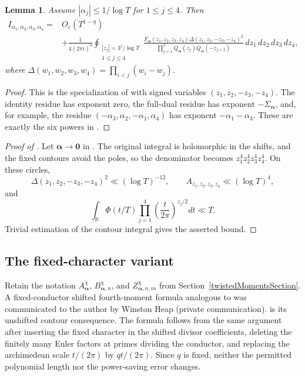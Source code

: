 \documentclass[oneside, 12pt]{amsart}
\newtheorem{lem}[thm]{Lemma}
\theoremstyle{definition}
\begin{document}
{		\begin{lem}\label{snaithContourLemma}
			Assume $|\alpha_j|\leq1/\log T$ for $1\leq j\leq4$.  Then
			\begin{align*}
				I_{\alpha_1,\alpha_2,\alpha_3,\alpha_4}
				={}&O_\varepsilon(T^{1-\eta})\\
				&+\frac1{4(2\pi i)^4}
				\oint_{\substack{|z_j|=3^j/\log T\\1\leq j\leq4}}
				\frac{F_{\boldsymbol\alpha}(z_1,z_2,z_3,z_4)
					\Delta(z_1,z_2,-z_3,-z_4)^2}
				{\displaystyle\prod_{j=1}^{2}
					Q_{\boldsymbol\alpha}(z_j)Q_{\boldsymbol\alpha}(-z_{j+2})}
				\,dz_1\,dz_2\,dz_3\,dz_4,
			\end{align*}
			where $\Delta(w_1,w_2,w_3,w_4)=\prod_{i<j}(w_i-w_j)$.
		\end{lem}
		
		\begin{proof}
			This is the specialization of
			\cite[Lemma~2.5.1]{ConreyFarmerKeatingRubinsteinSnaith} with signed
			variables $(z_1,z_2,-z_3,-z_4)$.  The identity residue has exponent
			zero, the full-dual residue has exponent
			$-\Sigma_{\boldsymbol\alpha}$, and, for example, the residue
			$(-\alpha_3,\alpha_2,-\alpha_1,\alpha_4)$ has exponent
			$-\alpha_1-\alpha_3$.  These are exactly the six powers in
			.
		\end{proof}
		
		\begin{proof}[Proof of ]
			Let $\boldsymbol\alpha\to\boldsymbol0$ in .
			The original integral is holomorphic in the shifts, and the fixed
			contours avoid the poles, so the denominator becomes
			$z_1^4z_2^4z_3^4z_4^4$.
			On these circles,
			\[
			\Delta(z_1,z_2,-z_3,-z_4)^2\ll(\log T)^{-12},
			\qquad A_{z_1,z_2,z_3,z_4}\ll(\log T)^4,
			\]
			and
			\[
			\int_{\mathbb R}\Phi(t/T)
			\prod_{j=1}^{4}\left(\frac t{2\pi}\right)^{z_j/2}dt\ll T.
			\]
			Trivial estimation of the contour integral gives the asserted bound.
		\end{proof}
		
		\subsection*{The fixed-character variant}
		Retain the notation $A^\chi_{\boldsymbol\alpha}$,
		$B^\chi_{\boldsymbol\alpha,n}$, and
		$Z^\chi_{\boldsymbol\alpha,n,m}$ from
		Section~\ref{twistedMomentsSection}.  A fixed-conductor shifted
		fourth-moment formula analogous to
		\cite[Theorem~1.1]{BettinBuiLiRadziwill} was communicated to the author by
		Winston Heap (private communication).   is its
		unshifted contour consequence.  The formula follows from the same argument after
		inserting the fixed character in the shifted divisor coefficients,
		deleting the finitely many Euler factors at primes dividing the
		conductor, and replacing the archimedean scale $t/(2\pi)$ by
		$qt/(2\pi)$.  Since $q$ is fixed, neither the permitted polynomial
		length nor the power-saving error changes.
		
		
	}
	
\end{document}

